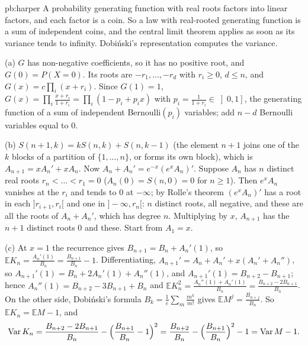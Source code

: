 \begin{solution}{pb:harper}
\idea A probability generating function with real roots factors into linear factors, and each factor is a coin. So a law with real-rooted generating function is a sum
of independent coins, and the central limit theorem applies as soon as its variance tends to infinity. Dobiński's representation computes the variance.

\writeup (a) $G$ has non-negative coefficients, so it has no positive root, and $G(0)=P(X=0)$. Its roots are $-r_1,\dots,-r_d$ with $r_i\ge0$, $d\le n$, and
$G(x)=c\prod_i(x+r_i)$. Since $G(1)=1$, $G(x)=\prod_i\frac{x+r_i}{1+r_i}=\prod_i(1-p_i+p_ix)$ with $p_i=\frac1{1+r_i}\in\left]0,1\right]$, the generating function of a sum of
independent Bernoulli$(p_i)$ variables; add $n-d$ Bernoulli variables equal to $0$.

(b) $S(n+1,k)=kS(n,k)+S(n,k-1)$ (the element $n+1$ joins one of the $k$ blocks of a partition of $\{1,\dots,n\}$, or forms its own block), which is
$A_{n+1}=xA_n'+xA_n$. Now $A_n+A_n'=e^{-x}(e^xA_n)'$. Suppose $A_n$ has $n$ distinct real roots $r_n<\dots<r_1=0$ ($A_n(0)=S(n,0)=0$ for $n\ge1$). Then $e^xA_n$ vanishes at the
$r_i$ and tends to $0$ at $-\infty$; by Rolle's theorem $(e^xA_n)'$ has a root in each $]r_{i+1},r_i[$ and one in $]-\infty,r_n[$: $n$ distinct roots, all negative, and these are
all the roots of $A_n+A_n'$, which has degree $n$. Multiplying by $x$, $A_{n+1}$ has the $n+1$ distinct roots $0$ and these. Start from $A_1=x$.

(c) At $x=1$ the recurrence gives $B_{n+1}=B_n+A_n'(1)$, so $\mathbb EK_n=\frac{A_n'(1)}{B_n}=\frac{B_{n+1}}{B_n}-1$. Differentiating, $A_{n+1}'=A_n+A_n'+x(A_n'+A_n'')$, so
$A_{n+1}'(1)=B_n+2A_n'(1)+A_n''(1)$, and $A_{n+1}'(1)=B_{n+2}-B_{n+1}$; hence $A_n''(1)=B_{n+2}-3B_{n+1}+B_n$ and
$\mathbb EK_n^2=\frac{A_n''(1)+A_n'(1)}{B_n}=\frac{B_{n+2}-2B_{n+1}}{B_n}$. On the other side, Dobiński's formula $B_k=\frac1e\sum_m\frac{m^k}{m!}$ gives
$\mathbb EM^j=\frac{B_{n+j}}{B_n}$. So $\mathbb EK_n=\mathbb EM-1$, and
\[
\operatorname{Var}K_n=\frac{B_{n+2}-2B_{n+1}}{B_n}-\Bigl(\frac{B_{n+1}}{B_n}-1\Bigr)^2=\frac{B_{n+2}}{B_n}-\Bigl(\frac{B_{n+1}}{B_n}\Bigr)^2-1=\operatorname{Var}M-1.
\]


\end{solution}
